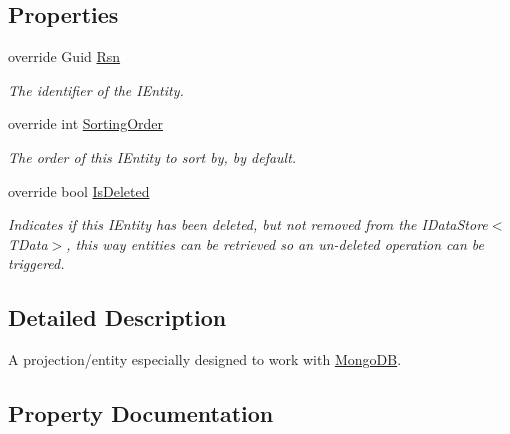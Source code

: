 \subsection*{Properties}
\begin{DoxyCompactItemize}
\item 
override Guid \hyperlink{classCqrs_1_1Mongo_1_1Entities_1_1MongoEntity_a445634030176c4991c0de152981c19ce_a445634030176c4991c0de152981c19ce}{Rsn}
\begin{DoxyCompactList}\small\item\em The identifier of the I\+Entity. \end{DoxyCompactList}\item 
override int \hyperlink{classCqrs_1_1Mongo_1_1Entities_1_1MongoEntity_a2f22c031f0aaa7b1b5eb6798d43d1ed2_a2f22c031f0aaa7b1b5eb6798d43d1ed2}{Sorting\+Order}
\begin{DoxyCompactList}\small\item\em The order of this I\+Entity to sort by, by default. \end{DoxyCompactList}\item 
override bool \hyperlink{classCqrs_1_1Mongo_1_1Entities_1_1MongoEntity_a197290ea383cab88aae05ee963b46221_a197290ea383cab88aae05ee963b46221}{Is\+Deleted}
\begin{DoxyCompactList}\small\item\em Indicates if this I\+Entity has been deleted, but not removed from the I\+Data\+Store$<$\+T\+Data$>$, this way entities can be retrieved so an un-\/deleted operation can be triggered. \end{DoxyCompactList}\end{DoxyCompactItemize}


\subsection{Detailed Description}
A projection/entity especially designed to work with \hyperlink{namespaceCqrs_1_1MongoDB}{Mongo\+DB}. 



\subsection{Property Documentation}
\mbox{\label{classCqrs_1_1Mongo_1_1Entities_1_1MongoEntity_a197290ea383cab88aae05ee963b46221_a197290ea383cab88aae05ee963b46221}} 
